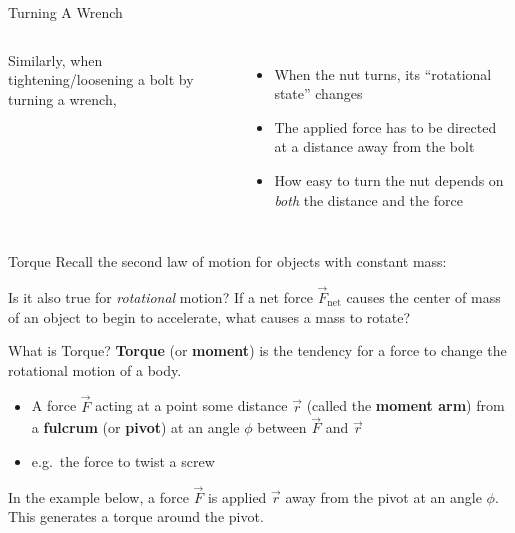 \documentclass[12pt,compress,aspectratio=169]{beamer}
\begin{document}
\begin{frame}{Turning A Wrench}
  \begin{columns}
    
    Similarly, when tightening/loosening a bolt by turning a wrench,
    \begin{itemize}
    \item When the nut turns, its ``rotational state'' changes
    \item The applied force has to be directed at a distance away from the
      bolt
    \item How easy to turn the nut depends on \emph{both} the distance and the
      force
    \end{itemize}
  \end{columns}
\end{frame}



\begin{frame}{Torque}
  Recall the second law of motion for objects with constant mass:
    

  \vspace{-.1in}Is it also true for \emph{rotational} motion? If a net force
  $\vec F_\text{net}$ causes the center of mass of an object to begin to
  accelerate, what causes a mass to rotate?
\end{frame}



\begin{frame}{What is Torque?}
  \textbf{Torque} (or \textbf{moment}) is the tendency for a force to change
  the rotational motion of a body.
  \begin{itemize}
  \item A force $\vec F$ acting at a point some distance $\vec r$ (called the
    \textbf{moment arm}) from a \textbf{fulcrum} (or \textbf{pivot}) at an angle
    $\phi$ between $\vec F$ and $\vec r$
  \item e.g.\ the force to twist a screw
  \end{itemize}
  In the example below, a force $\vec F$ is applied $\vec r$ away from the pivot
  at an angle $\phi$. This generates a torque around the pivot.
  \begin{center}
  \end{center}
\end{frame}
\end{document}

